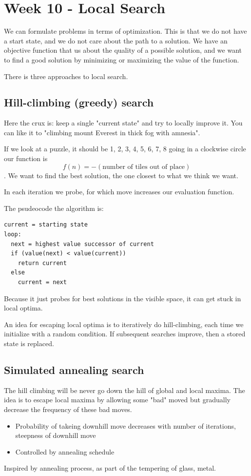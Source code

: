 \documentclass{article}
\begin{document}
\newpage
\section{Week 10 - Local Search}
We can formulate problems in terms of optimization. This is that we do not have
a start state, and we do not care about the path to a solution. We have an
objective function that us about the quality of a possible solution, and we want
to find a good solution by minimizing or maximizing the value of the function.

There is three approaches to local search.

\subsection{Hill-climbing (greedy) search}
Here the crux is: keep a single "current state" and try to locally improve it.
You can like it to "climbing mount Everest in thick fog with amnesia".

If we look at a puzzle, it should be 1, 2, 3, 4, 5, 6, 7, 8 going in a clockwise
circle our function is $$f(n) = -(\text{number of tiles out of place})$$.
We want to find the best solution, the one closest to what we think we want.

In each iteration we probe, for which move increases our evaluation function.

The psudeocode the algorithm is:

\begin{lstlisting}[inputencoding=utf8/latin1, keywordstyle=\color{blue}\bfseries, rulecolor=\color{black}]
current = starting state
loop:
  next = highest value successor of current
  if (value(next) < value(current))
    return current
  else 
    current = next
\end{lstlisting}

Because it just probes for best solutions in the visible space, it can get stuck
in local optima.

An idea for escaping local optima is to iteratively do hill-climbing, each time
we initialize with a random condition. If subsequent searches improve, then a
stored state is replaced.

\subsection{Simulated annealing search}

The hill climbing will be never go down the hill of global and local maxima. 
The idea is to escape local maxima by allowing some "bad" moved but gradually
decrease the frequency of these bad moves.
\begin{itemize}
  \item Probability of takeing downhill move decreases with number of
    iterations, steepness of downhill move
  \item Controlled by annealing schedule 
\end{itemize}
Inspired by annealing process, as part of the tempering of glass, metal.
\end{document}
